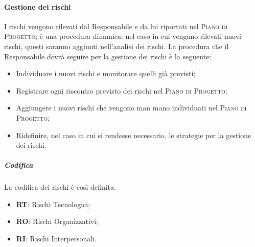 \documentclass[../norme-di-progetto.tex]{subfiles}
\begin{document}
\paragraph{Gestione dei rischi}
I rischi vengono rilevati dal Responsabile e da lui riportati nel \textsc{Piano di Progetto}; è una procedura dinamica: nel caso in cui vengano rilevati nuovi rischi, questi saranno aggiunti nell'analisi dei rischi. La procedura che il Responsabile dovrà seguire per la gestione dei rischi è la seguente:
\begin{itemize}
  \item Individuare i nuovi rischi e monitorare quelli già previsti;
  \item Registrare ogni riscontro previsto dei rischi nel \textsc{Piano di Progetto};
  \item Aggiungere i nuovi rischi che vengono man mano individuati nel \textsc{Piano di Progetto};
  \item Ridefinire, nel caso in cui si rendesse necessario, le strategie per la gestione dei rischi.
\end{itemize}
\subparagraph*{Codifica}
La codifica dei rischi è così definita: %
\begin{itemize}
  \item \textbf{RT}: Rischi Tecnologici;
  \item \textbf{RO}: Rischi Organizzativi;
  \item \textbf{RI}: Rischi Interpersonali.
\end{itemize}
\end{document}
